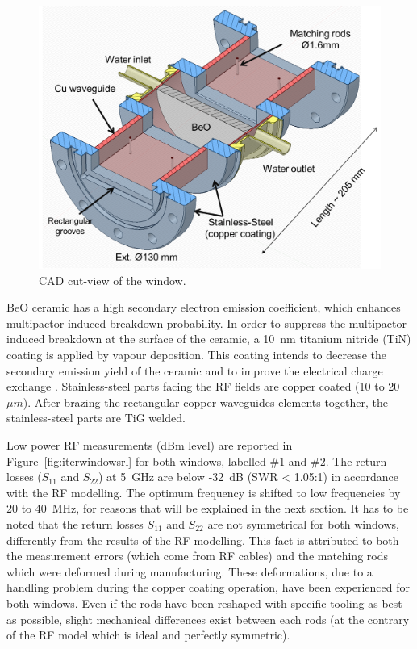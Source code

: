 {\begin{figure}
	\centering
	\includegraphics[width=1.0\linewidth]{figures/chap3/ITER_window/ITER_windows_geometry}
	\caption{CAD cut-view of the window.}
	\label{fig:iterwindowsgeometry}
\end{figure}

BeO ceramic has a high secondary electron emission coefficient, which enhances multipactor induced breakdown probability. In order to suppress the multipactor induced breakdown at the surface of the ceramic, a 10~\si{nm} titanium nitride (TiN) coating is applied by vapour deposition. This coating intends to decrease the secondary emission yield of the ceramic and to improve the electrical charge exchange  . Stainless-steel parts facing the RF fields are copper coated (10 to 20~$\si{\mu m}$).  After brazing the rectangular copper waveguides elements together, the stainless-steel parts are TiG welded. 

Low power RF measurements (dBm level) are reported in Figure~\ref{fig:iterwindowsrl} for both windows, labelled \#1 and \#2. The return losses ($S_{11}$ and $S_{22}$) at 5~GHz are below -32~dB (SWR < 1.05:1) in accordance with the RF modelling. The optimum frequency is shifted to low frequencies by 20 to 40~MHz, for reasons that will be explained in the next section. It has to be noted that the return losses $S_{11}$ and $S_{22}$ are not symmetrical for both windows, differently from the results of the RF modelling. This fact is attributed to both the measurement errors (which come from RF cables) and the matching rods which were deformed during manufacturing. These deformations, due to a handling problem during the copper coating operation, have been experienced for both windows. Even if the rods have been reshaped with specific tooling as best as possible, slight mechanical differences exist between each rods (at the contrary of the RF model which is ideal and perfectly symmetric). 

}

